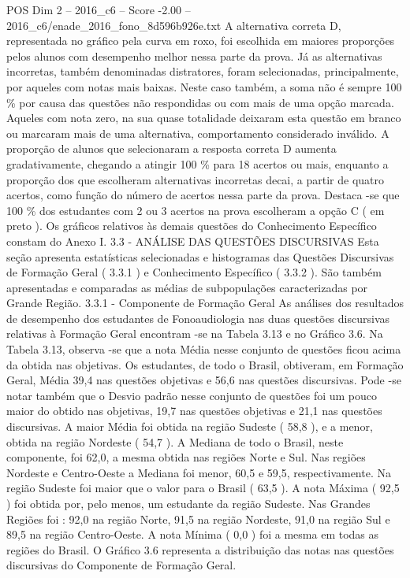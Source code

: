 \begin{textsample}{POS Dim 2 – 2016\_c6 – Score -2.00 – 2016\_c6/enade\_2016\_fono\_8d596b926e.txt}
A alternativa correta D, representada no gráfico pela curva em roxo, foi escolhida em maiores proporções pelos alunos com desempenho melhor nessa parte da prova.
Já as alternativas incorretas, também denominadas distratores, foram selecionadas, principalmente, por aqueles com notas mais baixas.
Neste caso também, a soma não é sempre 100 \% por causa das questões não respondidas ou com mais de uma opção marcada.
Aqueles com nota zero, na sua quase totalidade deixaram esta questão em branco ou marcaram mais de uma alternativa, comportamento considerado inválido.
A proporção de alunos que selecionaram a resposta correta D aumenta gradativamente, chegando a atingir 100 \% para 18 acertos ou mais, enquanto a proporção dos que escolheram alternativas incorretas decai, a partir de quatro acertos, como função do número de acertos nessa parte da prova.
Destaca -se que 100 \% dos estudantes com 2 ou 3 acertos na prova escolheram a opção C ( em preto ).
Os gráficos relativos às demais questões do Conhecimento Específico constam do Anexo I. 3.3 - ANÁLISE DAS QUESTÕES DISCURSIVAS Esta seção apresenta estatísticas selecionadas e histogramas das Questões Discursivas de Formação Geral ( 3.3.1 ) e Conhecimento Específico ( 3.3.2 ).
São também apresentadas e comparadas as médias de subpopulações caracterizadas por Grande Região. 3.3.1 - Componente de Formação Geral As análises dos resultados de desempenho dos estudantes de Fonoaudiologia nas duas questões discursivas relativas à Formação Geral encontram -se na Tabela 3.13 e no Gráfico 3.6.
Na Tabela 3.13, observa -se que a nota Média nesse conjunto de questões ficou acima da obtida nas objetivas.
Os estudantes, de todo o Brasil, obtiveram, em Formação Geral, Média 39,4 nas questões objetivas e 56,6 nas questões discursivas.
Pode -se notar também que o Desvio padrão nesse conjunto de questões foi um pouco maior do obtido nas objetivas, 19,7 nas questões objetivas e 21,1 nas questões discursivas.
A maior Média foi obtida na região Sudeste ( 58,8 ), e a menor, obtida na região Nordeste ( 54,7 ).
A Mediana de todo o Brasil, neste componente, foi 62,0, a mesma obtida nas regiões Norte e Sul.
Nas regiões Nordeste e Centro-Oeste a Mediana foi menor, 60,5 e 59,5, respectivamente.
Na região Sudeste foi maior que o valor para o Brasil ( 63,5 ).
A nota Máxima ( 92,5 ) foi obtida por, pelo menos, um estudante da região Sudeste.
Nas Grandes Regiões foi : 92,0 na região Norte, 91,5 na região Nordeste, 91,0 na região Sul e 89,5 na região Centro-Oeste.
A nota Mínima ( 0,0 ) foi a mesma em todas as regiões do Brasil.
O Gráfico 3.6 representa a distribuição das notas nas questões discursivas do Componente de Formação Geral.

\end{textsample}

